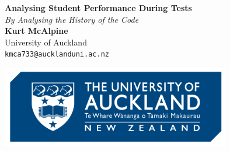 \documentclass[a1,portrait]{a0poster}
\begin{document}


\begin{minipage}[b]{0.75\textwidth}
\Huge \color{NavyBlue} \textbf{Analysing Student Performance During Tests} \color{Black}\\ %
\huge\textit{By Analysing the History of the Code}\\[2cm] %
\Large \textbf{Kurt McAlpine}\\[0.5cm] %
\Large University of Auckland\\[0.4cm] %
\large \texttt{kmca733@aucklanduni.ac.nz}\\
\end{minipage}
%
\begin{minipage}[b]{0.25\textwidth}
\includegraphics[width=10cm]{logo.png}\\
\end{minipage}

\vspace{1cm} %

\end{document}
